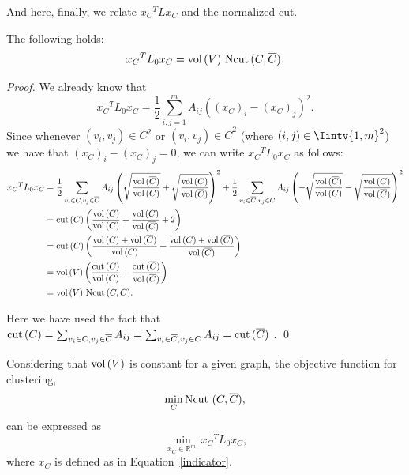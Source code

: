 And here, finally, we relate ${x_C}^TL{x_C}$ and the normalized cut.

\begin{theorem}\label{xtxcut}
   The following holds:
   \begin{equation}
      {x_C}^TL_0{x_C} = \operatorname*{vol\,}(V)\, \operatorname*{Ncut\,} (C, \overline C).
   \end{equation}
\end{theorem}

\begin{proof}
   We already know that
   \begin{equation*}
         {x_C}^TL_0{x_C} = \frac{1}{2} \sum_{i,j=1}^m A_{ij} ((x_C)_i - (x_C)_j) ^2 .
   \end{equation*}
   Since whenever $(v_i, v_j) \in C^2$ or $(v_i, v_j) \in {\overline C}^2$ (where $(i,j) \in \Iintv{1,m}^2$) we have that $(x_C)_i - (x_C)_j = 0$, we can write ${x_C}^TL_0{x_C}$ as follows:
   \begin{equation*}
      \begin{split}
         {x_C}^TL_0{x_C} &=  \frac{1}{2} \sum_{v_i \in C, v_j \in \overline C}A_{ij} \left( \sqrt{\frac{\operatorname*{vol\,} (\overline C)}{\operatorname*{vol\,} (C)}} + \sqrt{\frac{\operatorname*{vol\,} (C)}{\operatorname*{vol\,} (\overline C)}} \right)^2 + \frac{1}{2} \sum_{v_i \in \overline C, v_j \in C} A_{ij} \left( -\sqrt{\frac{\operatorname*{vol\,} (\overline C)}{\operatorname*{vol\,} (C)}}  -\sqrt{\frac{\operatorname*{vol\,} (C)}{\operatorname*{vol\,} (\overline C)}} \right)^2 \\
         &= \operatorname{cut\,} (C) \left( \frac{\operatorname*{vol\,} (\overline C)}{\operatorname*{vol\,} (C)} + \frac{\operatorname*{vol\,} (C)}{\operatorname*{vol\,} (\overline C)} + 2 \right) \\
         &= \operatorname{cut\,} (C) \left( \frac{\operatorname*{vol\,} (C) + \operatorname*{vol\,} (\overline C)}{\operatorname*{vol\,} (C)} + \frac{\operatorname*{vol\,} (C) + \operatorname*{vol\,} (\overline C)}{\operatorname*{vol\,} (\overline C)} \right) \\
         &= \operatorname*{vol\,} (V) \left( \frac{\operatorname{cut\,}(C)}{\operatorname*{vol\,} (C)} + \frac{\operatorname{cut\,}(\overline C)}{\operatorname*{vol\,} (\overline C)} \right) \\
         &= \operatorname*{vol\,} (V)\, \operatorname*{Ncut\,}(C, \overline C).
      \end{split}
   \end{equation*}

Here we have used the fact that $\operatorname{cut\,}(C) = \sum_{v_i \in C, v_j \in \overline C} A_{ij} =\sum_{v_i \in \overline C, v_j \in C} A_{ij} = \operatorname{cut\,}(\overline C)$ . \qed
\end{proof}

Considering that $\operatorname*{vol\,} (V)$ is constant for a given graph, the objective function for clustering,
\begin{equation}
   \min_C \operatorname*{Ncut\,}\,(C, \overline C),
\end{equation}
can be expressed as
\begin{equation}\label{npequation}
   \min_{x_C \in \mathbb R^{m }} \,{x_C}^T L_0 x_C \text{,}
\end{equation}
where $x_C$ is defined as in Equation~\vref{indicator}.

